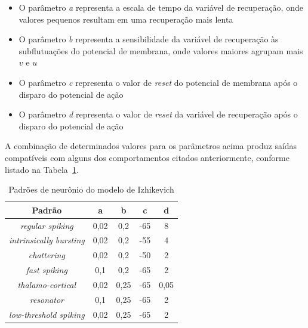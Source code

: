 \begin{itemize}
	\item O parâmetro \textit{a} representa a escala de tempo da variável de recuperação, onde valores pequenos resultam em uma recuperação mais lenta
	\item O parâmetro \textit{b} representa a sensibilidade da variável de recuperação às subflutuações do potencial de membrana, onde valores maiores agrupam mais $v$ e $u$
	\item O parâmetro \textit{c} representa o valor de \textit{reset} do potencial de membrana após o disparo do potencial de ação
	\item O parâmetro \textit{d} representa o valor de \textit{reset} da variável de recuperação após o disparo do potencial de ação
\end{itemize}
A combinação de determinados valores para os parâmetros acima produz saídas compatíveis com alguns dos comportamentos citados anteriormente, conforme listado na Tabela~\ref{tab:padroes_izhikevich}.
\begin{table}
	\centering
	\caption[Padrões de neurônio do modelo de Izhikevich]{Padrões de neurônio do modelo de Izhikevich}
	\label{tab:padroes_izhikevich}
	\begin{tabular}{|c|c|c|c|c|}
		\hline
		Padrão & a & b & c & d \\
		\hline
		\textit{regular spiking} & 0,02 & 0,2 & -65 & 8 \\
		\hline
		\textit{intrinsically bursting} & 0,02 & 0,2 & -55 & 4 \\
		\hline
		\textit{chattering} & 0,02 & 0,2 & -50 & 2 \\
		\hline
		\textit{fast spiking} & 0,1 & 0,2 & -65 & 2 \\
		\hline
		\textit{thalamo-cortical} & 0,02 & 0,25 & -65 & 0,05 \\
		\hline
		\textit{resonator} & 0,1 & 0,25 & -65 & 2 \\
		\hline
		\textit{low-threshold spiking} & 0,02 & 0,25 & -65 & 2 \\
		\hline
	\end{tabular}
\end{table}

